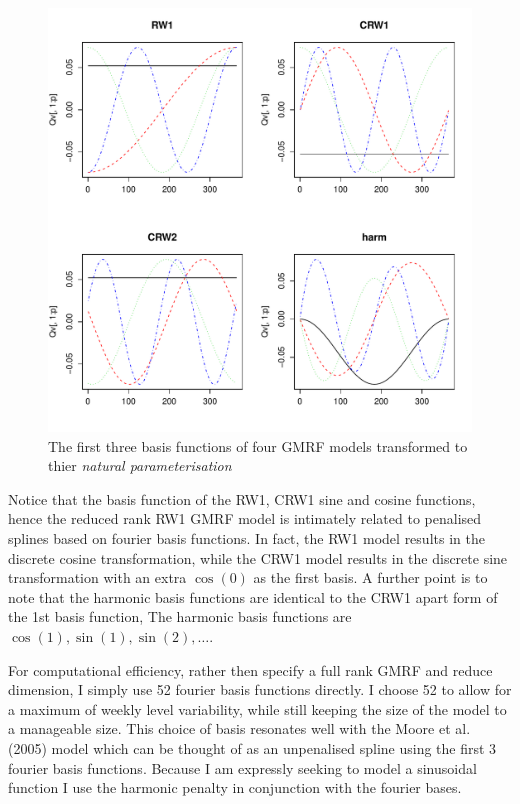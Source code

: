\begin{figure}
  \centering
  \includegraphics[width=\textwidth]{eigendecomp-1}
\caption{The first three basis functions of four GMRF models transformed to thier \textit{natural parameterisation}}
\label{fig:chptr4:eigenBasis}
\end{figure}

Notice that the basis function of the RW1, CRW1 sine and cosine functions, hence the reduced rank RW1 GMRF model is intimately related to penalised splines based on fourier basis functions. In fact, the RW1 model results in the discrete cosine transformation, while the CRW1 model results in the discrete sine transformation with an extra $\cos(0)$ as the first basis. A further point is to note that the harmonic basis functions are identical to the CRW1 apart form of the 1st basis function, The harmonic basis functions are $\cos(1), \sin(1), \sin(2), \ldots$.

For computational efficiency, rather then specify a full rank GMRF and reduce dimension, I simply use 52 fourier basis functions directly.  I choose 52 to allow for a maximum of weekly level variability, while still keeping the size of the model to a manageable size.  This choice of basis resonates well with the Moore et al. (2005) model which can be thought of as an unpenalised spline using the first 3 fourier basis functions. Because I am expressly seeking to model a sinusoidal function I use the harmonic penalty in conjunction with the fourier bases. 

